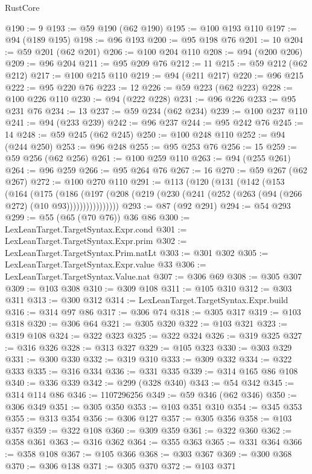 \begin{lexlean}{RustCore}
\begin{coremodule}
@190 := 9
@193 := @59 @190 (@62 @190)
@195 := @100 @193 @110
@197 := @94 (@189 @195)
@198 := @96 @193
@200 := @95 @198 @76
@201 := 10
@204 := @59 @201 (@62 @201)
@206 := @100 @204 @110
@208 := @94 (@200 @206)
@209 := @96 @204
@211 := @95 @209 @76
@212 := 11
@215 := @59 @212 (@62 @212)
@217 := @100 @215 @110
@219 := @94 (@211 @217)
@220 := @96 @215
@222 := @95 @220 @76
@223 := 12
@226 := @59 @223 (@62 @223)
@228 := @100 @226 @110
@230 := @94 (@222 @228)
@231 := @96 @226
@233 := @95 @231 @76
@234 := 13
@237 := @59 @234 (@62 @234)
@239 := @100 @237 @110
@241 := @94 (@233 @239)
@242 := @96 @237
@244 := @95 @242 @76
@245 := 14
@248 := @59 @245 (@62 @245)
@250 := @100 @248 @110
@252 := @94 (@244 @250)
@253 := @96 @248
@255 := @95 @253 @76
@256 := 15
@259 := @59 @256 (@62 @256)
@261 := @100 @259 @110
@263 := @94 (@255 @261)
@264 := @96 @259
@266 := @95 @264 @76
@267 := 16
@270 := @59 @267 (@62 @267)
@272 := @100 @270 @110
@291 := @113
    (@120
      (@131
        (@142
          (@153
            (@164
              (@175
                (@186
                  (@197
                    (@208 (@219 (@230 (@241 (@252 (@263 (@94 (@266 @272) (@10 @93))))))))))))))))
@293 := @87 (@92 @291)
@294 := @54 @293
@299 := @55 (@65 (@70 @76)) @36 @86
@300 := LexLeanTarget.TargetSyntax.Expr.cond
@301 := LexLeanTarget.TargetSyntax.Expr.prim
@302 := LexLeanTarget.TargetSyntax.Prim.natLt
@303 := @301 @302
@305 := LexLeanTarget.TargetSyntax.Expr.value @33
@306 := LexLeanTarget.TargetSyntax.Value.nat
@307 := @306 @69
@308 := @305 @307
@309 := @103 @308
@310 := @309 @108
@311 := @105 @310
@312 := @303 @311
@313 := @300 @312
@314 := LexLeanTarget.TargetSyntax.Expr.build
@316 := @314 @97 @86
@317 := @306 @74
@318 := @305 @317
@319 := @103 @318
@320 := @306 @64
@321 := @305 @320
@322 := @103 @321
@323 := @319 @108
@324 := @322 @323
@325 := @322 @324
@326 := @319 @325
@327 := @316 @326
@328 := @313 @327
@329 := @105 @323
@330 := @303 @329
@331 := @300 @330
@332 := @319 @310
@333 := @309 @332
@334 := @322 @333
@335 := @316 @334
@336 := @331 @335
@339 := @314 @165 @86 @108
@340 := @336 @339
@342 := @299 (@328 @340)
@343 := @54 @342
@345 := @314 @114 @86
@346 := 1107296256
@349 := @59 @346 (@62 @346)
@350 := @306 @349
@351 := @305 @350
@353 := @103 @351 @310
@354 := @345 @353
@355 := @313 @354
@356 := @306 @127
@357 := @305 @356
@358 := @103 @357
@359 := @322 @108
@360 := @309 @359
@361 := @322 @360
@362 := @358 @361
@363 := @316 @362
@364 := @355 @363
@365 := @331 @364
@366 := @358 @108
@367 := @105 @366
@368 := @303 @367
@369 := @300 @368
@370 := @306 @138
@371 := @305 @370
@372 := @103 @371

\end{coremodule}
\end{lexlean}
